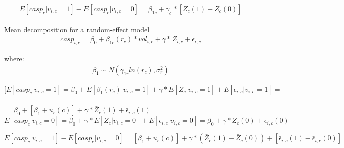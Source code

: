 \documentclass[10pt, letterpaper]{article}
\begin{document}
\begin{spacing}{1.4}
\begin{spacing}{.9}
\[	E[casp_{c}|v_{i,c}=1] - E[casp_{c}|v_{i,c}=0]= \beta_{1c}+ \gamma_{c}*[\bar{Z}_{c}(1)-\bar{Z}_{c}(0)]
\] \\

Mean decomposition for a random-effect model \\

 \begin{eqnarray}
	casp_{i,c}=\beta_{0}+  \beta_{1c}(r_{c})* vol_{i,c}+\gamma*Z_{i,c} + \epsilon_{i,c} 
 \end{eqnarray}

where: 
 \begin{eqnarray}
		\beta_{1} \sim N(\gamma_{1r}ln(r_{c}),\sigma^{2}_{r})
 \end{eqnarray}

$[E[casp_{c}|v_{i,c}=1]= \beta_{0}+E[\beta_{1}(r_{c})|v_{i,c}=1] + \gamma*E[Z_{c}|v_{i,c}=1]+ E[\epsilon_{i,c}|v_{i,c}=1]=$ \\
\\
$=\beta_{0}+ [\beta_{1}+u_{r}(c)]+\gamma*\bar{Z}_{c}(1) + \bar{\epsilon}_{i,c}(1) $
\\ 
  
\[E[casp_{c}|v_{i,c}=0]= \beta_{0}+ \gamma*E[Z_{c}|v_{i,c}=0] + E[\epsilon_{i,c}|v_{i,c}=0] = \beta_{0}+  \gamma*\bar{Z}_{c}(0) + \bar{\epsilon}_{i,c}(0) \]

\[E[casp_{c}|v_{i,c}=1]-E[casp_{c}|v_{i,c}=0]= [\beta_{1}+u_{r}(c)]+ \gamma*(\bar{Z}_{c}(1)-\bar{Z}_{c}(0))+ [\bar{\epsilon}_{i,c}(1)-\bar{\epsilon}_{i,c}(0)] \]

\end{spacing}
\end{spacing}
\end{document}
